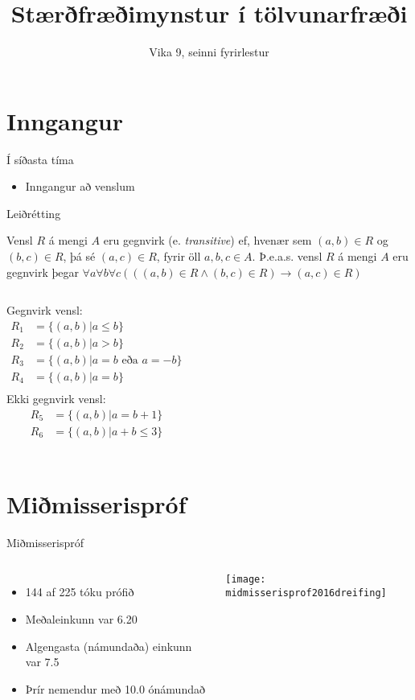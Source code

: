 \documentclass{beamer}
\title{Stærðfræðimynstur í tölvunarfræði}
\subtitle{Vika 9, seinni fyrirlestur}
\begin{document}
\begin{frame}
\titlepage
\end{frame}


\section{Inngangur}

\begin{frame}{Í síðasta tíma}
\begin{itemize}
 \item Inngangur að venslum
\end{itemize}
\end{frame}

\begin{frame}[fragile]{Leiðrétting}

\begin{tcolorbox}[title={\color{red}Gegnvirk} vensl]
Vensl $R$ á mengi $A$ eru {\color{red}gegnvirk} (e. \emph{transitive}) ef, hvenær sem $(a, b) \in R$ og $(b, c) \in R$, þá sé $(a, c) \in R$, fyrir öll $a, b, c \in A$. Þ.e.a.s. vensl $R$ á mengi $A$ eru {\color{red}gegnvirk} þegar $\forall a\forall b\forall c(((a, b) \in R \land (b, c) \in R) \to (a, c) \in R)$
\end{tcolorbox}
\begin{columns}
Gegnvirk vensl:
\begin{align*}
R_1 &= \{(a, b)|a \leq b\}\\
R_2 &= \{(a, b)|a > b\}\\
R_3 &= \{(a, b)|a = b \text{ eða } a = -b\}\\
R_4 &= \{(a, b)|a = b\}\\
\end{align*}
Ekki gegnvirk vensl:
\begin{align*}
R_5 &= \{(a, b)|a = b+1\}\\
R_6 &= \{(a, b)|a+b \leq 3\}\\
\end{align*}
\end{columns}
\end{frame}

\section{Miðmisserispróf}

\begin{frame}{Miðmisserispróf}
\begin{columns}
\begin{itemize}
 \item 144 af 225 tóku prófið
 \item Meðaleinkunn var 6.20
 \item Algengasta (námundaða) einkunn var 7.5
 \item Þrír nemendur með 10.0 ónámundað
\end{itemize}
\begin{center}
\texttt{[image: midmisserisprof2016dreifing]}
\end{center}
\end{columns}
\end{frame}
\end{document}
